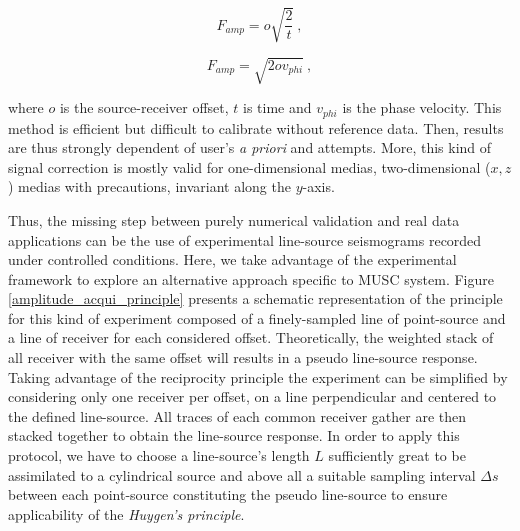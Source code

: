 \documentclass[manuscript,revised]{geophysics}
\begin{document}
\begin{equation}
	\label{eq:direct-wave}
	F_{amp}=o\sqrt{\frac{2}{t}}\ ,
\end{equation}

\begin{equation}
	\label{eq:single-velocity}
	F_{amp}=\sqrt{2ov_{phi}}\ ,
\end{equation}

\noindent where $o$ is the source-receiver offset, $t$ is time and $v_{phi}$ is the phase velocity. This method is efficient but difficult to calibrate without reference data. Then, results are thus strongly dependent of user's \textit{a priori} and attempts. More, this kind of signal correction is mostly valid for one-dimensional medias, two-dimensional ($x,z$) medias with precautions, invariant along the $y$-axis.    


\noindent Thus, the missing step between purely numerical validation and real data applications can be the use of experimental line-source seismograms recorded under controlled conditions. Here, we take advantage of the experimental framework to explore an alternative approach specific to MUSC system. Figure \ref{amplitude_acqui_principle} presents a schematic representation of the principle for this kind of experiment composed of a finely-sampled line of point-source and a line of receiver for each considered offset. Theoretically, the weighted stack of all receiver with the same offset will results in a pseudo line-source response. Taking advantage of the reciprocity principle the experiment can be simplified by considering only one receiver per offset, on a line perpendicular and centered to the defined line-source. All traces of each common receiver gather are then stacked together to obtain the line-source response. In order to apply this protocol, we have to choose a line-source's length $L$ sufficiently great to be assimilated to a cylindrical source and above all a suitable sampling interval $\Delta s$ between each point-source constituting the pseudo line-source to ensure applicability of the \textit{Huygen's principle}. 
\end{document}
